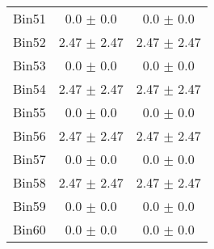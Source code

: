 \begin{tabular}{|c|c|c|}
     Bin51 & 0.0 $\pm$ 0.0 & 0.0 $\pm$ 0.0 \\ \cline{1-3} 
     Bin52 & 2.47 $\pm$ 2.47 & 2.47 $\pm$ 2.47 \\ \cline{1-3} 
     Bin53 & 0.0 $\pm$ 0.0 & 0.0 $\pm$ 0.0 \\ \cline{1-3} 
     Bin54 & 2.47 $\pm$ 2.47 & 2.47 $\pm$ 2.47 \\ \cline{1-3} 
     Bin55 & 0.0 $\pm$ 0.0 & 0.0 $\pm$ 0.0 \\ \cline{1-3} 
     Bin56 & 2.47 $\pm$ 2.47 & 2.47 $\pm$ 2.47 \\ \cline{1-3} 
     Bin57 & 0.0 $\pm$ 0.0 & 0.0 $\pm$ 0.0 \\ \cline{1-3} 
     Bin58 & 2.47 $\pm$ 2.47 & 2.47 $\pm$ 2.47 \\ \cline{1-3} 
     Bin59 & 0.0 $\pm$ 0.0 & 0.0 $\pm$ 0.0 \\ \cline{1-3} 
     Bin60 & 0.0 $\pm$ 0.0 & 0.0 $\pm$ 0.0 \\ \cline{1-3} 
  \end{tabular}
